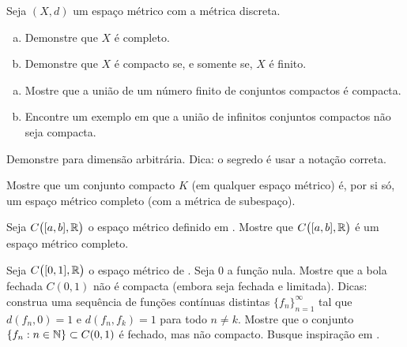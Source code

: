 \begin{exercise}
Seja $(X,d)$ um espaço métrico com a métrica discreta.
\begin{enumerate}[a)]
\item
Demonstre que $X$ é completo.
\item
Demonstre que $X$ é compacto se, e somente se, $X$ é finito.
\end{enumerate}
\end{exercise}

\begin{exercise}
\leavevmode
\begin{enumerate}[a)]
\item
Mostre que a união de um número finito de conjuntos compactos é compacta.
\item
Encontre um exemplo em que a união de infinitos conjuntos compactos não
seja compacta.
\end{enumerate}
\end{exercise}

\begin{exercise}
Demonstre  para dimensão arbitrária.
Dica: o segredo é usar a notação correta.
\end{exercise}

\begin{exercise} \label{exercise:subspacecompact}
Mostre que um conjunto compacto $K$ (em qualquer espaço métrico)
é, por si só, um espaço métrico completo (com a métrica de subespaço).
\end{exercise}

\begin{exercise} \label{exercise:CabRcomplete}
Seja $C\bigl([a,b],{\mathbb{R}}\bigr)$ o espaço métrico definido em
. Mostre que
$C\bigl([a,b],{\mathbb{R}}\bigr)$ é um espaço métrico completo.
\end{exercise}

\begin{exercise}[Desafio] \label{exercise:msclbounnotcompt}
Seja $C\bigl([0,1],{\mathbb{R}}\bigr)$ o espaço métrico de
. Seja $0$
a função nula. Mostre que a bola fechada
$C(0,1)$ não é compacta (embora seja fechada e limitada).
Dicas: construa uma sequência de funções contínuas distintas
$\{ f_n \}_{n=1}^\infty$ tal que
$d(f_n,0) = 1$ e $d(f_n,f_k) = 1$ para todo $n \neq k$. Mostre que
o conjunto $\{ f_n : n \in {\mathbb{N}} \} \subset C(0,1)$ é fechado, mas não compacto.
Busque inspiração em .
\end{exercise}

